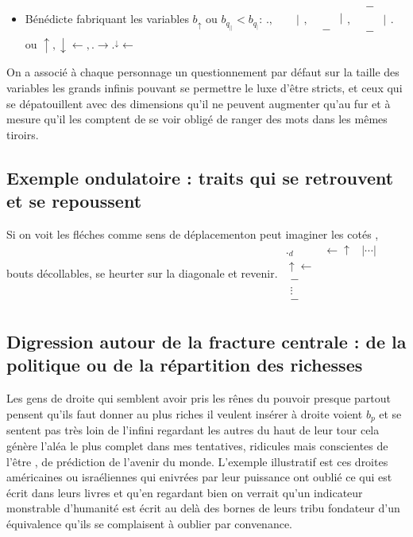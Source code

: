 \documentclass{article}
\begin{document}
\begin{itemize}
\item Bénédicte fabriquant les variables 
\subitem $b_\uparrow$ ou  $b_{q_{||}} < b_{q_{|}}$: 
$.,
\begin{matrix}
 && \\
 &&|\\
&&
\end{matrix},
\begin{matrix}
 && \\
 &&|\\
&-&
\end{matrix},
\begin{matrix}
 &-& \\
 &&|\\
&-&
\end{matrix}$. ou $\uparrow, \downarrow \leftarrow,.\rightarrow .^\downarrow \leftarrow$

\end{itemize}

On a associé à chaque personnage un questionnement par défaut sur la taille des variables les grands infinis pouvant se permettre le luxe d'être stricts, et ceux qui se dépatouillent avec des dimensions qu'il ne peuvent augmenter qu'au fur et à mesure qu'il les comptent de se voir obligé de ranger des mots dans les mêmes tiroirs. 

\subsection{Exemple ondulatoire : traits qui se retrouvent et se repoussent}
Si on voit les fléches comme sens de déplacementon peut imaginer  les cotés , bouts décollables,  se heurter sur la diagonale et revenir.
$
\begin{matrix}
._d&\leftarrow\uparrow &|\cdots |\\
\uparrow\leftarrow \\
\begin{matrix}
-\\ \vdots \\ -
\end{matrix}
\end{matrix}
$


\subsection{Digression autour de la fracture centrale : de la politique ou de la répartition des richesses }
Les gens de droite qui semblent avoir pris les rênes du pouvoir presque partout pensent qu'ils faut donner au plus riches il veulent insérer à droite voient $b_p$ et se sentent pas très loin de l'infini regardant les autres du haut de leur tour cela génère l'aléa le plus complet dans mes tentatives, ridicules mais conscientes de l'être , de prédiction de l'avenir du monde. L'exemple illustratif est ces droites américaines ou israéliennes qui enivrées par leur puissance ont oublié ce qui est écrit dans leurs livres et qu'en regardant bien on verrait qu'un indicateur monstrable d'humanité est écrit au delà des bornes de leurs tribu  fondateur d'un équivalence qu'ils se complaisent à oublier par convenance.
\end{document}
